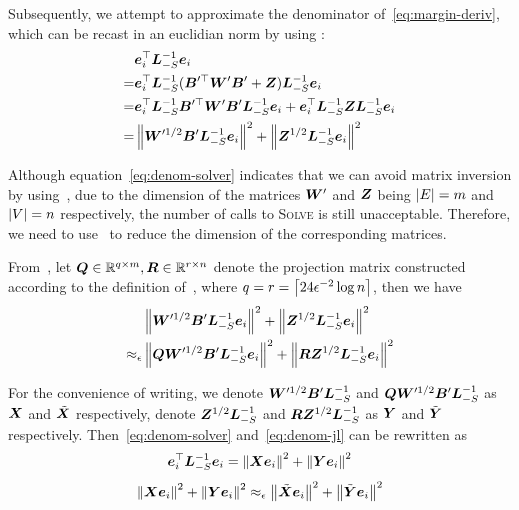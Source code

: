 \documentclass[sigconf]{acmart}
\begin{document}
Subsequently, we attempt to approximate the denominator of~\eqref{eq:margin-deriv}, which can be recast in an euclidian norm by using :
\begin{equation}\label{eq:denom-solver}
    \begin{split}
        &\boldsymbol{e}_i^\top\boldsymbol{L}_{-S}^{-1}\boldsymbol{e}_i\\
        =&\boldsymbol{e}_i^\top\boldsymbol{L}_{-S}^{-1}(\boldsymbol{B}'^\top\boldsymbol{W}'\boldsymbol{B}'+\boldsymbol{Z})\boldsymbol{L}_{-S}^{-1}\boldsymbol{e}_i\\
        =&\boldsymbol{e}_i^\top\boldsymbol{L}_{-S}^{-1}\boldsymbol{B}'^\top\boldsymbol{W}'\boldsymbol{B}'\boldsymbol{L}_{-S}^{-1}\boldsymbol{e}_i+\boldsymbol{e}_i^\top\boldsymbol{L}_{-S}^{-1}\boldsymbol{Z}\boldsymbol{L}_{-S}^{-1}\boldsymbol{e}_i\\
        =&\left\Vert\boldsymbol{W}'^{1/2}\boldsymbol{B}'\boldsymbol{L}_{-S}^{-1}\boldsymbol{e}_i\right\Vert^2+\left\Vert\boldsymbol{Z}^{1/2}\boldsymbol{L}_{-S}^{-1}\boldsymbol{e}_i\right\Vert^2
    \end{split}
\end{equation}

Although equation~\eqref{eq:denom-solver} indicates that we can avoid matrix inversion by using~, due to the dimension of the matrices \(\boldsymbol{W}'\) and \(\boldsymbol{Z}\) being \(\left|E \right|=m\) and \(\left|V \right|=n\) respectively, the number of calls to \textsc{Solve} is still unacceptable.
Therefore, we need to use~ to reduce the dimension of the corresponding matrices.

From~, let \(\boldsymbol{Q}\in\mathbb{R}^{q\times m},\boldsymbol{R}\in\mathbb{R}^{r\times n}\) denote the projection matrix constructed according to the definition of~, where \(q=r=\left\lceil24\epsilon^{-2}\log n\right\rceil\), then we have
\begin{equation}\label{eq:denom-jl}
    \begin{split}
        &\left\Vert\boldsymbol{W}'^{1/2}\boldsymbol{B}'\boldsymbol{L}_{-S}^{-1}\boldsymbol{e}_i\right\Vert^2+\left\Vert\boldsymbol{Z}^{1/2}\boldsymbol{L}_{-S}^{-1}\boldsymbol{e}_i\right\Vert^2\\
        \approx_\epsilon&\left\Vert\boldsymbol{Q}\boldsymbol{W}'^{1/2}\boldsymbol{B}'\boldsymbol{L}_{-S}^{-1}\boldsymbol{e}_i\right\Vert^2+\left\Vert\boldsymbol{R}\boldsymbol{Z}^{1/2}\boldsymbol{L}_{-S}^{-1}\boldsymbol{e}_i\right\Vert^2
    \end{split}
\end{equation}

For the convenience of writing, we denote \(\boldsymbol{W}'^{1/2}\boldsymbol{B}'\boldsymbol{L}_{-S}^{-1}\) and \(\boldsymbol{Q}\boldsymbol{W}'^{1/2}\boldsymbol{B}'\boldsymbol{L}_{-S}^{-1}\) as \(\boldsymbol{X}\) and \(\tilde{\boldsymbol{X}}\) respectively, denote \(\boldsymbol{Z}^{1/2}\boldsymbol{L}_{-S}^{-1}\) and \(\boldsymbol{R}\boldsymbol{Z}^{1/2}\boldsymbol{L}_{-S}^{-1}\) as \(\boldsymbol{Y}\) and \(\tilde{\boldsymbol{Y}}\) respectively.
Then~\eqref{eq:denom-solver} and~\eqref{eq:denom-jl} can be rewritten as
\begin{equation}\label{eq:denom-solver-simp}
    \boldsymbol{e}_i^\top\boldsymbol{L}_{-S}^{-1}\boldsymbol{e}_i=\left\Vert\boldsymbol{X}\boldsymbol{e}_i\right\Vert^2+\left\Vert\boldsymbol{Y}\boldsymbol{e}_i\right\Vert^2
\end{equation}
\begin{equation}\label{eq:denom-jl-simp}
    \left\Vert\boldsymbol{X}\boldsymbol{e}_i\right\Vert^2+\left\Vert\boldsymbol{Y}\boldsymbol{e}_i\right\Vert^2\approx_\epsilon\left\Vert\tilde{\boldsymbol{X}}\boldsymbol{e}_i\right\Vert^2+\left\Vert\tilde{\boldsymbol{Y}}\boldsymbol{e}_i\right\Vert^2
\end{equation}
\end{document}
